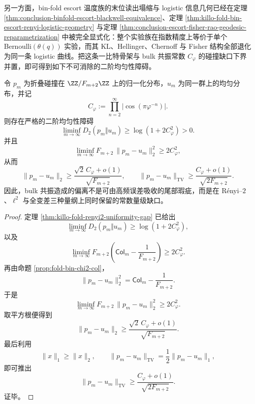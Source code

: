 另一方面，bin-fold escort 温度族的末位读出塌缩与 logistic 信息几何已经在定理 \ref{thm:conclusion-binfold-escort-blackwell-equivalence}、定理 \ref{thm:killo-fold-bin-escort-renyi-logistic-geometry} 与定理 \ref{thm:conclusion-escort-fisher-rao-geodesic-reparametrization} 中被完全显式化：整个实验族在指数精度上等价于单个 Bernoulli\((\theta(q))\) 实验，而其 KL、Hellinger、Chernoff 与 Fisher 结构全部退化为同一条 logistic 曲线。把这条一比特骨架与 bulk 共振常数 \(C_\varphi\) 的碰撞缺口下界并置，即可得到如下不可消除的二阶均匀性障碍。

\begin{theorem}\label{thm:conclusion-binfold-renyi2-uniformity-obstruction-from-resonance}
令 \(p_m\) 为折叠碰撞在 \(\ZZ/F_{m+2}\ZZ\) 上的归一化分布，\(u_m\) 为同一群上的均匀分布，并记
\[
C_\varphi:=\prod_{n=2}^{\infty}\bigl|\cos(\pi\varphi^{-n})\bigr|.
\]
则存在严格的二阶均匀性障碍
\[
\liminf_{m\to\infty} D_2(p_m\Vert u_m)\ge \log(1+2C_\varphi^2)>0.
\]
并且
\[
\liminf_{m\to\infty}
F_{m+2}\,\|p_m-u_m\|_2^2
\ge
2C_\varphi^2,
\]
从而
\[
\|p_m-u_m\|_2
\ge
\frac{\sqrt2\,C_\varphi+o(1)}{\sqrt{F_{m+2}}},
\qquad
\|p_m-u_m\|_{\mathrm{TV}}
\ge
\frac{C_\varphi+o(1)}{\sqrt{2F_{m+2}}}.
\]
因此，bulk 共振造成的偏离不是可由高频误差吸收的尾部瑕疵，而是在 Rényi--\(2\)、\(\ell^2\) 与全变差三种量纲上同时保留的常数量级缺口。
\end{theorem}
\begin{proof}
定理 \ref{thm:killo-fold-renyi2-uniformity-gap} 已给出
\[
\liminf_{m\to\infty} D_2(p_m\Vert u_m)\ge \log(1+2C_\varphi^2),
\]
以及
\[
\liminf_{m\to\infty}F_{m+2}\!\left(\mathsf{Col}_m-\frac1{F_{m+2}}\right)\ge 2C_\varphi^2.
\]
再由命题 \ref{prop:fold-bin-chi2-col}，
\[
\|p_m-u_m\|_2^2=\mathsf{Col}_m-\frac1{F_{m+2}}.
\]
于是
\[
\liminf_{m\to\infty}F_{m+2}\,\|p_m-u_m\|_2^2\ge 2C_\varphi^2.
\]
取平方根便得到
\[
\|p_m-u_m\|_2\ge \frac{\sqrt2\,C_\varphi+o(1)}{\sqrt{F_{m+2}}}.
\]
最后利用
\[
\|x\|_1\ge \|x\|_2,
\qquad
\|p_m-u_m\|_{\mathrm{TV}}=\frac12\|p_m-u_m\|_1,
\]
即可推出
\[
\|p_m-u_m\|_{\mathrm{TV}}
\ge
\frac{C_\varphi+o(1)}{\sqrt{2F_{m+2}}}.
\]
证毕。
\end{proof}

